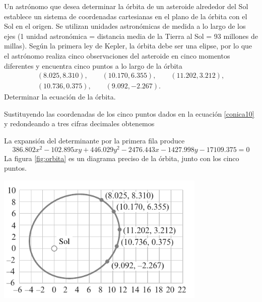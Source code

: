 \begin{examplebox}{}{}
    Un astrónomo que desea determinar la órbita de un asteroide alrededor del Sol establece un sistema de coordenadas cartesianas en el plano de la órbita con el Sol en el origen. Se utilizan unidades astronómicas de medida a lo largo de los ejes (1 unidad astronómica = distancia media de la Tierra al Sol = 93 millones de millas). Según la primera ley de Kepler, la órbita debe ser una elipse, por lo que el astrónomo realiza cinco observaciones del asteroide en cinco momentos diferentes y encuentra cinco puntos a lo largo de la órbita
    \begin{gather*}
        (8.025, 8.310), \qquad (10.170, 6.355), \qquad (11.202, 3.212), \\
        (10.736, 0.375), \qquad (9.092, -2.267).
    \end{gather*}
    Determinar la ecuación de la órbita.

    \tcblower
    \solucion Sustituyendo las coordenadas de los cinco puntos dados en la ecuación \eqref{conica10} y redondeando a tres cifras decimales obtenemos
    \begin{matrizn}
    \end{matrizn}
    La expansión del determinante por la primera fila produce
    $$386.802x^2 - 102.895xy + 446.029y^2 - 2476.443x - 1427.998y - 17109.375 = 0$$
    La figura \ref{fig:orbita} es un diagrama preciso de la órbita, junto con los cinco puntos.
    \begin{center}
        \includegraphics[width=0.75\textwidth]{Images/Capitulo8/Orbita.pdf}
         \label{fig:orbita}
    \end{center}
\end{examplebox}

